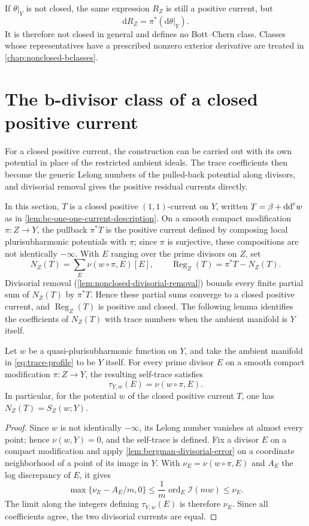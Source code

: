 If $\theta|_Y$ is not closed, the same expression $R_Z$ is still a positive current, but
\[
 \mathrm{d}R_Z=\pi^*(\mathrm{d}\theta|_Y).
\]
It is therefore not closed in general and defines no Bott--Chern class. Classes whose representatives have a prescribed nonzero exterior derivative are treated in \cref{chap:nonclosed-bclasses}.

\section{The b-divisor class of a closed positive current}

For a closed positive current, the construction can be carried out with its own potential in place of the restricted ambient ideals. The trace coefficients then become the generic Lelong numbers of the pulled-back potential along divisors, and divisorial removal gives the positive residual currents directly.

In this section, $T$ is a closed positive $(1,1)$-current on $Y$, written $T=\beta+\mathrm{dd}^{\mathrm{c}} w$ as in \cref{lem:bc-one-one-current-description}. On a smooth compact modification $\pi\colon Z\to Y$, the pullback $\pi^*T$ is the positive current defined by composing local plurisubharmonic potentials with $\pi$; since $\pi$ is surjective, these compositions are not identically $-\infty$. With $E$ ranging over the prime divisors on $Z$, set
\[
 N_Z(T)=\sum_E\nu(w\circ\pi,E)[E],\qquad
 \operatorname{Reg}_Z(T)=\pi^*T-N_Z(T).
\]
Divisorial removal (\cref{lem:nonclosed-divisorial-removal}) bounds every finite partial sum of $N_Z(T)$ by $\pi^*T$. Hence these partial sums converge to a closed positive current, and $\operatorname{Reg}_Z(T)$ is positive and closed. The following lemma identifies the coefficients of $N_Z(T)$ with trace numbers when the ambient manifold is $Y$ itself.

\begin{lemma}\label{lem:self-trace-is-siu}
Let $w$ be a quasi-plurisubharmonic function on $Y$, and take the ambient manifold in \eqref{eq:trace-profile} to be $Y$ itself. For every prime divisor $E$ on a smooth compact modification $\pi\colon Z\to Y$, the resulting self-trace satisfies
\[
 \tau_{Y,w}(E)=\nu(w\circ\pi,E).
\]
In particular, for the potential $w$ of the closed positive current $T$, one has $N_Z(T)=S_Z(w;Y)$.
\end{lemma}
\begin{proof}
Since $w$ is not identically $-\infty$, its Lelong number vanishes at almost every point; hence $\nu(w,Y)=0$, and the self-trace is defined. Fix a divisor $E$ on a compact modification and apply \cref{lem:bergman-divisorial-error} on a coordinate neighborhood of a point of its image in $Y$. With $\nu_E=\nu(w\circ\pi,E)$ and $A_E$ the log discrepancy of $E$, it gives
\[
 \max\{\nu_E-A_E/m,0\}
 \leq\frac1m\operatorname{ord}_E\mathcal I(mw)
 \leq\nu_E.
\]
The limit along the integers defining $\tau_{Y,w}(E)$ is therefore $\nu_E$. Since all coefficients agree, the two divisorial currents are equal.
\end{proof}

